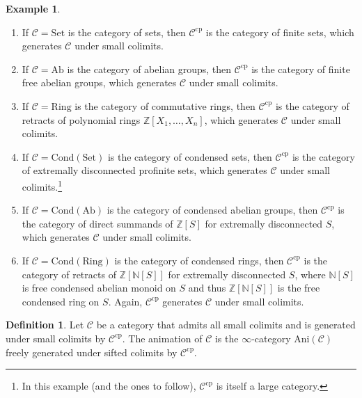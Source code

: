 \documentclass[11pt]{amsbook}
\numberwithin{equation}{section}
\numberwithin{theorem}{section}
\theoremstyle{definition}
\newtheorem{definition}[theorem]{Definition}
\newtheorem{example}[theorem]{Example}
\begin{document}
\begin{example}\leavevmode
\begin{enumerate}
\item If $\mathcal C=\mathrm{Set}$ is the category of sets, then $\mathcal C^{\mathrm{cp}}$ is the category of finite sets, which generates $\mathcal C$ under small colimits.
\item If $\mathcal C=\mathrm{Ab}$ is the category of abelian groups, then $\mathcal C^{\mathrm{cp}}$ is the category of finite free abelian groups, which generates $\mathcal C$ under small colimits.
\item If $\mathcal C=\mathrm{Ring}$ is the category of commutative rings, then $\mathcal C^{\mathrm{cp}}$ is the category of retracts of polynomial rings $\mathbb Z[X_1,\ldots,X_n]$, which generates $\mathcal C$ under small colimits.
\item If $\mathcal C=\mathrm{Cond}(\mathrm{Set})$ is the category of condensed sets, then $\mathcal C^{\mathrm{cp}}$ is the category of extremally disconnected profinite sets, which generates $\mathcal C$ under small colimits.\footnote{In this example (and the ones to follow), $\mathcal C^{\mathrm{cp}}$ is itself a large category.}
\item If $\mathcal C=\mathrm{Cond}(\mathrm{Ab})$ is the category of condensed abelian groups, then $\mathcal C^{\mathrm{cp}}$ is the category of direct summands of $\mathbb Z[S]$ for extremally disconnected $S$, which generates $\mathcal C$ under small colimits.
\item If $\mathcal C=\mathrm{Cond}(\mathrm{Ring})$ is the category of condensed rings, then $\mathcal C^{\mathrm{cp}}$ is the category of retracts of $\mathbb Z[\mathbb N[S]]$ for extremally disconnected $S$, where $\mathbb N[S]$ is free condensed abelian monoid on $S$ and thus $\mathbb Z[\mathbb N[S]]$ is the free condensed ring on $S$. Again, $\mathcal C^{\mathrm{cp}}$ generates $\mathcal C$ under small colimits.
\end{enumerate}
\end{example}

\begin{definition} Let $\mathcal C$ be a category that admits all small colimits and is generated under small colimits by $\mathcal C^{\mathrm{cp}}$. The animation of $\mathcal C$ is the $\infty$-category $\mathrm{Ani}(\mathcal C)$ freely generated under sifted colimits by $\mathcal C^{\mathrm{cp}}$.
\end{definition}
\end{document}
